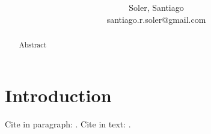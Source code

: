 \documentclass[a4paper,11pt,twoside]{article}
\begin{document}
\title{\bf }
\author{Soler, Santiago \\{\small santiago.r.soler@gmail.com }}
\date{}

\vspace{-1cm}
\maketitle
\vspace{-1cm}

\begin{abstract}
Abstract
\end{abstract}



\section{Introduction}


Cite in paragraph: \citep[e.g.][]{Tanaka1999}.
Cite in text: \citet{Tanaka1999}.




\end{document}
